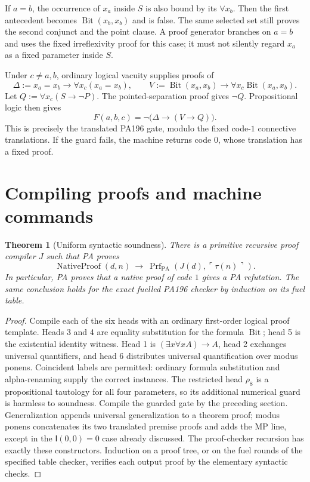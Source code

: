 \documentclass[11pt]{article}
\newtheorem{theorem}{Theorem}
\newcommand{\PA}{\mathrm{PA}}
\newcommand{\Bit}{\operatorname{Bit}}
\newcommand{\Prf}{\operatorname{Prf}}
\newcommand{\I}{\mathsf I}
\newcommand{\tr}{\tau}
\begin{document}
If $a=b$, the occurrence of $x_a$ inside $S$ is also bound by its
$\forall x_b$.  Then the first antecedent becomes $\Bit(x_b,x_b)$
and is false.  The same selected set still proves the second
conjunct and the point clause.  A proof generator branches on
$a=b$ and uses the fixed irreflexivity proof for this case; it must
not silently regard $x_a$ as a fixed parameter inside $S$.

Under $c\ne a,b$, ordinary logical vacuity supplies proofs of
\[
 \Delta:=x_a=x_b\to\forall x_c(x_a=x_b),\qquad
 V:=\Bit(x_a,x_b)\to\forall x_c\Bit(x_a,x_b).
\]
Let $Q:=\forall x_c(S\to\neg P)$.  The pointed-separation proof gives
$\neg Q$.  Propositional logic then gives
\[
 F(a,b,c)=\neg\bigl(\Delta\to(V\to Q)\bigr).
\]
This is precisely the translated PA196 gate, modulo the fixed
code-$1$ connective translations.  If the guard fails, the machine
returns code $0$, whose translation has a fixed proof.

\section{Compiling proofs and machine commands}

\begin{theorem}[Uniform syntactic soundness]
There is a primitive recursive proof compiler $J$ such that PA proves
\[
 \operatorname{NativeProof}(d,n)\ \longrightarrow\
 \Prf_{\PA}(J(d),\ulcorner\tr(n)\urcorner).
\]
In particular, PA proves that a native proof of code $1$ gives a PA
refutation.  The same conclusion holds for the exact fuelled PA196
checker by induction on its fuel table.
\end{theorem}
\begin{proof}
Compile each of the six heads with an ordinary first-order logical
proof template.  Heads 3 and 4 are equality substitution for the
formula $\Bit$; head 5 is the existential identity witness.  Head 1
is $(\exists x\forall x A)\to A$, head 2 exchanges universal
quantifiers, and head 6 distributes universal quantification over
modus ponens.  Coincident labels are permitted: ordinary formula
substitution and alpha-renaming supply the correct instances.
The restricted head $\rho_8$ is a propositional tautology for all
four parameters, so its additional numerical guard is harmless to
soundness.  Compile the guarded gate by the preceding section.
Generalization appends universal generalization to a theorem proof;
modus ponens concatenates its two translated premise proofs and
adds the MP line, except in the $\I(0,0)=0$ case already discussed.
The proof-checker recursion has exactly these constructors.  Induction
on a proof tree, or on the fuel rounds of the specified table checker,
verifies each output proof by the elementary syntactic checks.
\end{proof}
\end{document}
